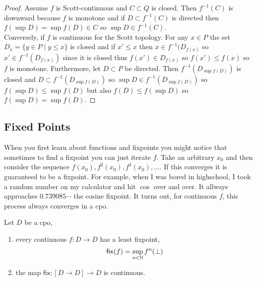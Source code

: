 \documentclass[12pt]{article}
\begin{document}
\begin{proof}
Assume $f$ is Scott-continuous and $C \subset Q$ is closed. Then $f^{-1}(C)$ is downward because $f$ is monotone and if $D \subset f^{-1}(C)$ is directed then $f(\sup D) = \sup f(D) \in C$ so $\sup D \in f^{-1}(C)$. 
\bigskip\\
Conversely, if $f$ is continuous for the Scott topology. For any $x \in P$ the set $D_x = \{ y \in P \mid y \le x \}$ is closed and if $x' \le x$ then $x \in f^{-1}(D_{f(x)}$ so $x' \in f^{-1}(D_{f(x)})$ since it is closed thus $f(x') \in D_{f(x)}$ so $f(x') \le f(x)$ so $f$ is monotone. Furthermore, let $D \subset P$ be directed. Then $f^{-1}(D_{\sup f(D)})$ is closed and $D \subset f^{-1}(D_{\sup f(D)})$ so $\sup D \in f^{-1}(D_{\sup f(D)})$ so $f(\sup D) \le \sup f(D)$ but also $f(D) \le f(\sup D)$ so $f(\sup D) = \sup f(D)$.  
\end{proof}

\subsection{Fixed Points}

\renewcommand{\fix}{\mathsf{fix}}
\renewcommand{\it}{\mathsf{it}}

When you first learn about functions and fixpoints you might notice that sometimes to find a fixpoint you can just iterate $f$. Take an arbitrary $x_0$ and then consider the sequence $f(x_0), f^2(x_0),  f^3(x_0), \dots$. If this converges it is guaranteed to be a fixpoint. For example, when I was bored in highschool, I took a random number on my calculator and hit $\cos$ over and over. It allways approaches $0.739085 \cdots$ the cosine fixpoint. It turns out, for continuous $f$, this process always converges in a cpo. 

\begin{theorem}[Kleene]
Let $D$ be a cpo,
\begin{enumerate}
\item every continuous $f : D \to D$ has a least fixpoint,
\[ \fix(f) = \sup_{n \in \N} f^n(\bot) \]
\item the map $\fix : [D \to D] \to D$ is continuous. 
\end{enumerate}
\end{theorem}
\end{document}
